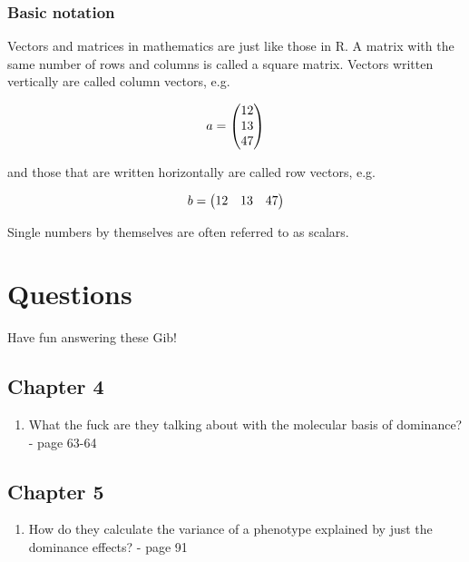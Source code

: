 \documentclass[
]{book}
\providecommand{\tightlist}{%
  \setlength{\itemsep}{0pt}\setlength{\parskip}{0pt}}
\begin{document}
\hypertarget{basic-notation}{%
\subsection{Basic notation}\label{basic-notation}}

Vectors and matrices in mathematics are just like those in R. A matrix with the same number of rows and columns is called a square matrix. Vectors written vertically are called column vectors, e.g.~

\begin{equation}
    a = 
    \begin{pmatrix}
        12 \\
        13 \\
        47
    \end{pmatrix}
    \notag
\end{equation}

and those that are written horizontally are called row vectors, e.g.~

\begin{equation}
    b = 
    \begin{pmatrix}
        12 & 13 & 47
    \end{pmatrix}
    \notag
\end{equation}

Single numbers by themselves are often referred to as scalars.

\hypertarget{questions}{%
\chapter*{Questions}\label{questions}}

Have fun answering these Gib!

\hypertarget{chapter-4}{%
\section*{Chapter 4}\label{chapter-4}}

\begin{enumerate}
\def\labelenumi{\arabic{enumi}.}
\tightlist
\item
  What the fuck are they talking about with the molecular basis of dominance? - page 63-64
\end{enumerate}

\hypertarget{chapter-5}{%
\section*{Chapter 5}\label{chapter-5}}

\begin{enumerate}
\def\labelenumi{\arabic{enumi}.}
\tightlist
\item
  How do they calculate the variance of a phenotype explained by just the dominance effects? - page 91
\end{enumerate}
\end{document}
